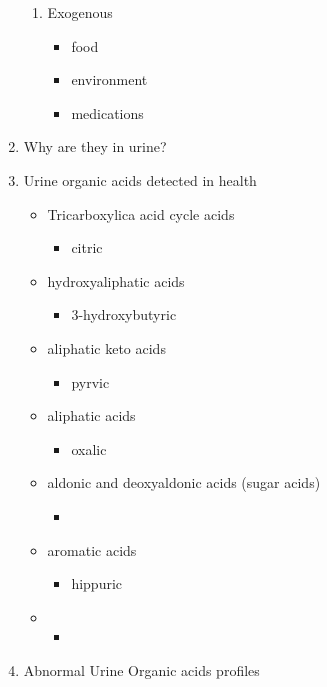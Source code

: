\documentclass{scrartcl}
\begin{document}
\begin{enumerate}
\begin{enumerate}
\item Exogenous
\label{sec:org8dfa56b}
\begin{itemize}
\item food
\item environment
\item medications
\end{itemize}
\end{enumerate}

\item Why are they in urine?
\label{sec:org48b6e13}

\item Urine organic acids detected in health
\label{sec:org5f02b5e}

\begin{itemize}
\item Tricarboxylica acid cycle acids
\begin{itemize}
\item citric
\end{itemize}
\item hydroxyaliphatic acids
\begin{itemize}
\item 3-hydroxybutyric
\end{itemize}
\item aliphatic keto acids
\begin{itemize}
\item pyrvic
\end{itemize}
\item aliphatic acids
\begin{itemize}
\item oxalic
\end{itemize}
\item aldonic and deoxyaldonic acids (sugar acids)
\begin{itemize}
\item 
\end{itemize}
\item aromatic acids
\begin{itemize}
\item hippuric
\end{itemize}
\item \begin{itemize}
\item 
\end{itemize}
\end{itemize}

\item Abnormal Urine Organic acids profiles
\label{sec:orgb02a979}


\end{enumerate}
\end{document}
